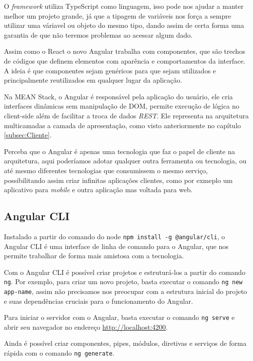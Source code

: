 \documentclass[
	12pt,				%
	openright,			%
	twoside,			%
	a4paper,			%
	english,			%
	brazil				%
	]{abntex2}
\begin{document}
O \textit{framework} utiliza TypeScript como linguagem, isso pode nos ajudar a manter melhor um projeto grande, já que a tipagem de variáveis nos força a sempre utilizar uma váriavel ou objeto do mesmo tipo, dando assim de certa forma uma garantia de que não teremos problemas ao acessar algum dado.

Assim como o React o novo Angular trabalha com componentes, que são trechos de códigos que definem elementos com aparência e comportamentos da interface. A ideia é que componentes sejam genéricos para que sejam utilizados e principalmente reutilizados em qualquer lugar da aplicação.

Na MEAN Stack, o Angular é responsável pela aplicação do usuário, ele cria interfaces dinâmicas sem manipulação de DOM, permite execução de lógica no client-side além de facilitar a troca de dados \textit{REST}. Ele representa na arquitetura multicamadas a camada de apresentação, como visto anteriormente no capítulo \ref{subsec:Cliente}.

Perceba que o Angular é apenas uma tecnologia que faz o papel de cliente na arquitetura, aqui poderíamos adotar qualquer outra ferramenta ou tecnologia, ou até mesmo diferentes tecnologias que consumissem o mesmo serviço, possibilitando assim criar infinitas aplicações clientes, como por exmeplo um aplicativo para \textit{mobile} e outra aplicação mas voltada para web.

\subsection{Angular CLI} 

Instalado a partir do comando do node \verb|npm install -g @angular/cli|, o Angular CLI é uma interface de linha de comando para o Angular, que nos permite trabalhar de forma mais amistosa com a tecnologia.

Com o Angular CLI é possível criar projetos e estruturá-los a partir do comando \verb|ng|. Por exemplo, para criar um novo projeto, basta executar o comando \verb|ng new app-name|, assim não precisamos nos preocupar com a estrutura inicial do projeto e suas dependências cruciais para o funcionamento do Angular. 

Para iniciar o servidor com o Angular, basta executar o comando \verb|ng serve| e abrir seu navegador no endereço \href{http://localhost:4200}{http://localhost:4200}.

Ainda é possível criar componentes, pipes, módulos, diretivas e serviços de forma rápida com o comando \verb|ng generate|.
\end{document}
